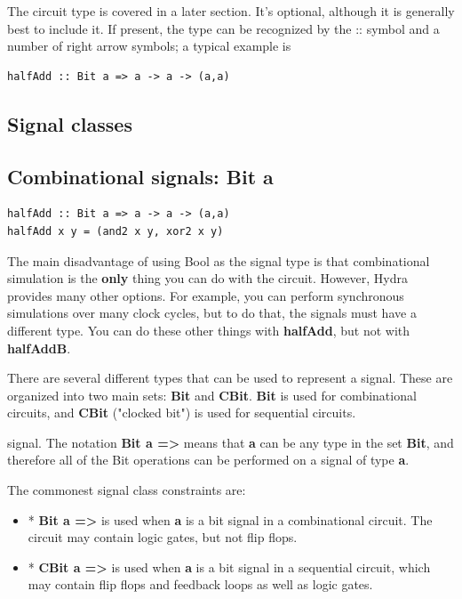 \documentclass[]{svmono}
\begin{document}
The circuit type is covered in a later section.  It's optional,
although it is generally best to include it.  If present, the type
can be recognized by the :: symbol and a number of right arrow
symbols; a typical example is

\begin{verbatim}
halfAdd :: Bit a => a -> a -> (a,a)
\end{verbatim}
\subsection*{Signal classes}
\label{sec:orge2993c4}
\subsection*{Combinational signals: Bit a}
\label{sec:org7edba9c}

\begin{verbatim}
halfAdd :: Bit a => a -> a -> (a,a)
halfAdd x y = (and2 x y, xor2 x y)
\end{verbatim}

The main disadvantage of using Bool as the signal type is that
combinational simulation is the \textbf{only} thing you can do with the
circuit.  However, Hydra provides many other options.  For
example, you can perform synchronous simulations over many clock
cycles, but to do that, the signals must have a different type.
You can do these other things with \textbf{halfAdd}, but not with
\textbf{halfAddB}.

There are several different types that can be used to represent a
signal.  These are organized into two main sets: \textbf{Bit} and \textbf{CBit}.
\textbf{Bit} is used for combinational circuits, and \textbf{CBit} ("clocked
bit") is used for sequential circuits.

signal.  The notation \textbf{Bit a =>} means that \textbf{a} can be any type in
the set \textbf{Bit}, and therefore all of the Bit operations can be
performed on a signal of type \textbf{a}.

The commonest signal class constraints are:

\begin{itemize}
\item * \textbf{Bit a =>} is used when \textbf{a} is a bit signal in a combinational
circuit.  The circuit may contain logic gates, but not flip
flops.

\item * \textbf{CBit a =>} is used when \textbf{a} is a bit signal in a sequential
circuit, which may contain flip flops and feedback loops as well
as logic gates.
\end{itemize}
\end{document}
